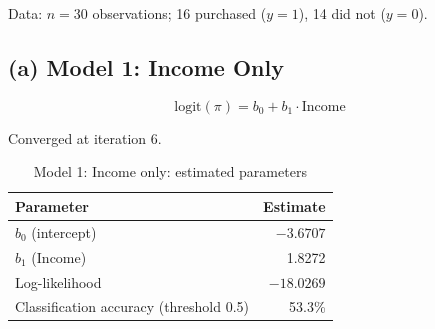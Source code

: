 \documentclass[12pt,a4paper]{article}
\begin{document}
Data: $n = 30$ observations; 16 purchased ($y = 1$), 14 did not ($y = 0$).

\subsection{(a) Model 1: Income Only}

\[
  \text{logit}(\pi) = b_0 + b_1 \cdot \text{Income}
\]

Converged at iteration 6.

\begin{table}[H]
\centering
\caption{Model 1: Income only: estimated parameters}
\begin{tabular}{lr}
\toprule
Parameter & Estimate \\
\midrule
$b_0$ (intercept)   & $-3.6707$ \\
$b_1$ (Income)      &  1.8272  \\
\midrule
Log-likelihood & $-18.0269$ \\
Classification accuracy (threshold 0.5) & 53.3\% \\
\bottomrule
\end{tabular}
\end{table}
\end{document}
